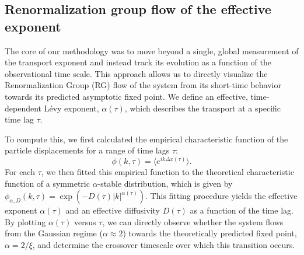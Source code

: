 \documentclass[]{article}
\begin{document}
\subsection{Renormalization group flow of the effective exponent}
The core of our methodology was to move beyond a single, global measurement of the transport exponent and instead track its evolution as a function of the observational time scale. This approach allows us to directly visualize the Renormalization Group (RG) flow of the system from its short-time behavior towards its predicted asymptotic fixed point. We define an effective, time-dependent Lévy exponent, $\alpha(\tau)$, which describes the transport at a specific time lag $\tau$.

To compute this, we first calculated the empirical characteristic function of the particle displacements for a range of time lags $\tau$:
\begin{equation}
\phi(k, \tau) = \langle e^{ik\Delta x(\tau)} \rangle.
\end{equation}
For each $\tau$, we then fitted this empirical function to the theoretical characteristic function of a symmetric $\alpha$-stable distribution, which is given by $\phi_{\alpha, D}(k, \tau) = \exp(-D(\tau)|k|^{\alpha(\tau)})$. This fitting procedure yields the effective exponent $\alpha(\tau)$ and an effective diffusivity $D(\tau)$ as a function of the time lag. By plotting $\alpha(\tau)$ versus $\tau$, we can directly observe whether the system flows from the Gaussian regime ($\alpha \approx 2$) towards the theoretically predicted fixed point, $\alpha = 2/\xi$, and determine the crossover timescale over which this transition occurs.
\end{document}
